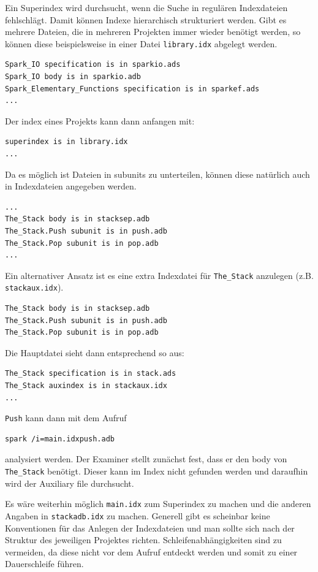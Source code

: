 Ein Superindex wird durchsucht, wenn die Suche in regulären Indexdateien fehlschlägt. Damit können Indexe hierarchisch strukturiert werden. Gibt es mehrere Dateien, die in mehreren Projekten immer wieder benötigt werden, so können diese beispielsweise in einer Datei \texttt{library.idx} abgelegt werden.

\begin{verbatim}
Spark_IO specification is in sparkio.ads
Spark_IO body is in sparkio.adb
Spark_Elementary_Functions specification is in sparkef.ads
...
\end{verbatim}

Der index eines Projekts kann dann anfangen mit:

\begin{verbatim}
superindex is in library.idx
...
\end{verbatim}

Da es möglich ist Dateien in subunits zu unterteilen, können diese natürlich auch in Indexdateien angegeben werden.

\begin{verbatim}
...
The_Stack body is in stacksep.adb
The_Stack.Push subunit is in push.adb
The_Stack.Pop subunit is in pop.adb
...
\end{verbatim}

Ein alternativer Ansatz ist es eine extra Indexdatei für \texttt{The\_Stack} anzulegen (z.B. \texttt{stackaux.idx}).

\begin{verbatim}
The_Stack body is in stacksep.adb
The_Stack.Push subunit is in push.adb
The_Stack.Pop subunit is in pop.adb
\end{verbatim}

Die Hauptdatei sieht dann entsprechend so aus:

\begin{verbatim}
The_Stack specification is in stack.ads
The_Stack auxindex is in stackaux.idx
...
\end{verbatim}

\texttt{Push} kann dann mit dem Aufruf

\begin{verbatim}
spark /i=main.idxpush.adb
\end{verbatim}

analysiert werden.
Der Examiner stellt zunächst fest, dass er den body von \texttt{The\_Stack} benötigt. Dieser kann im Index nicht gefunden werden und daraufhin wird der Auxiliary file durchsucht.

Es wäre weiterhin möglich \texttt{main.idx} zum Superindex zu machen und die anderen Angaben in \texttt{stackadb.idx} zu machen. Generell gibt es scheinbar keine Konventionen für das Anlegen der Indexdateien und man sollte sich nach der Struktur des jeweiligen Projektes richten. Schleifenabhängigkeiten sind zu vermeiden, da diese nicht vor dem Aufruf entdeckt werden und somit zu einer Dauerschleife führen.

